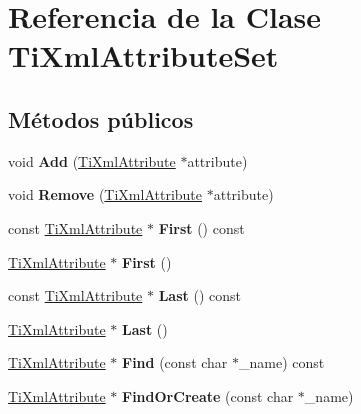 \hypertarget{class_ti_xml_attribute_set}{\section{Referencia de la Clase Ti\-Xml\-Attribute\-Set}
\label{class_ti_xml_attribute_set}
}
\subsection*{Métodos públicos}
\begin{DoxyCompactItemize}
\item 
\hypertarget{class_ti_xml_attribute_set_a745e50ddaae3bee93e4589321e0b9c1a}{void {\bfseries Add} (\hyperlink{class_ti_xml_attribute}{Ti\-Xml\-Attribute} $\ast$attribute)}\label{class_ti_xml_attribute_set_a745e50ddaae3bee93e4589321e0b9c1a}

\item 
\hypertarget{class_ti_xml_attribute_set_a924a73d071f2573f9060f0be57879c57}{void {\bfseries Remove} (\hyperlink{class_ti_xml_attribute}{Ti\-Xml\-Attribute} $\ast$attribute)}\label{class_ti_xml_attribute_set_a924a73d071f2573f9060f0be57879c57}

\item 
\hypertarget{class_ti_xml_attribute_set_ae0636e88cedd4b09d61c451860f68598}{const \hyperlink{class_ti_xml_attribute}{Ti\-Xml\-Attribute} $\ast$ {\bfseries First} () const }\label{class_ti_xml_attribute_set_ae0636e88cedd4b09d61c451860f68598}

\item 
\hypertarget{class_ti_xml_attribute_set_a99703bb08ca2aece2d7ef835de339ba0}{\hyperlink{class_ti_xml_attribute}{Ti\-Xml\-Attribute} $\ast$ {\bfseries First} ()}\label{class_ti_xml_attribute_set_a99703bb08ca2aece2d7ef835de339ba0}

\item 
\hypertarget{class_ti_xml_attribute_set_a7b3f3ccf39a97bc25539d3fcc540296a}{const \hyperlink{class_ti_xml_attribute}{Ti\-Xml\-Attribute} $\ast$ {\bfseries Last} () const }\label{class_ti_xml_attribute_set_a7b3f3ccf39a97bc25539d3fcc540296a}

\item 
\hypertarget{class_ti_xml_attribute_set_ab4c4edfb2d74f6ea31aae096743bd6e0}{\hyperlink{class_ti_xml_attribute}{Ti\-Xml\-Attribute} $\ast$ {\bfseries Last} ()}\label{class_ti_xml_attribute_set_ab4c4edfb2d74f6ea31aae096743bd6e0}

\item 
\hypertarget{class_ti_xml_attribute_set_af3675cc2bfd0aea153cda1cfcdd1f77e}{\hyperlink{class_ti_xml_attribute}{Ti\-Xml\-Attribute} $\ast$ {\bfseries Find} (const char $\ast$\-\_\-name) const }\label{class_ti_xml_attribute_set_af3675cc2bfd0aea153cda1cfcdd1f77e}

\item 
\hypertarget{class_ti_xml_attribute_set_a5e28f5d32f048fba85d04dc317495bdc}{\hyperlink{class_ti_xml_attribute}{Ti\-Xml\-Attribute} $\ast$ {\bfseries Find\-Or\-Create} (const char $\ast$\-\_\-name)}\label{class_ti_xml_attribute_set_a5e28f5d32f048fba85d04dc317495bdc}

\end{DoxyCompactItemize}


